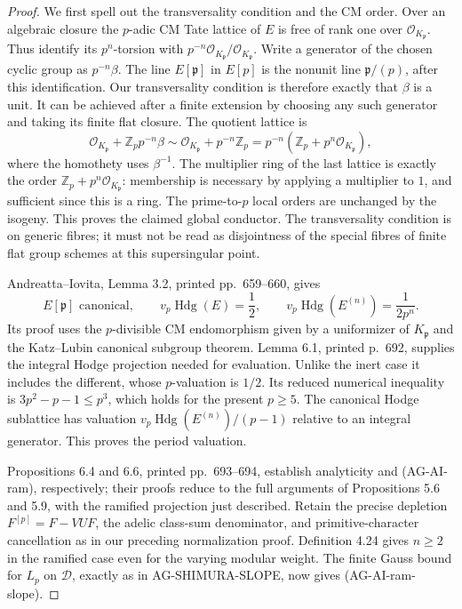 \begin{proof}
We first spell out the transversality condition and the CM order.
Over an algebraic closure the $p$-adic CM Tate lattice of $E$ is
free of rank one over $\mathcal O_{K_{\mathfrak p}}$.
Thus identify its $p^n$-torsion with
$p^{-n}\mathcal O_{K_{\mathfrak p}}/\mathcal O_{K_{\mathfrak p}}$.
Write a generator of the chosen cyclic group as
$p^{-n}\beta$.  The line $E[\mathfrak p]$ in $E[p]$ is
the nonunit line $\mathfrak p/(p)$, after this identification.
Our transversality condition is therefore exactly that $\beta$
is a unit.  It can be achieved after a finite extension by
choosing any such generator and taking its finite flat closure.
The quotient lattice is
\[
 \mathcal O_{K_{\mathfrak p}}+\mathbb Z_p p^{-n}\beta
 \sim \mathcal O_{K_{\mathfrak p}}+p^{-n}\mathbb Z_p
 =p^{-n}(\mathbb Z_p+p^n\mathcal O_{K_{\mathfrak p}}),
\]
where the homothety uses $\beta^{-1}$.  The multiplier ring of
the last lattice is exactly the order
$\mathbb Z_p+p^n\mathcal O_{K_{\mathfrak p}}$: membership is
necessary by applying a multiplier to $1$, and sufficient since
this is a ring.  The prime-to-$p$ local orders are unchanged by
the isogeny.  This proves the claimed global conductor.
The transversality condition is on generic fibres; it must not
be read as disjointness of the special fibres of finite flat
group schemes at this supersingular point.

Andreatta--Iovita, Lemma 3.2, printed pp.~659--660, gives
\[
 E[\mathfrak p]\text{ canonical},\qquad
 v_p\operatorname{Hdg}(E)=\frac12,\qquad
 v_p\operatorname{Hdg}(E^{(n)})=\frac1{2p^n}.
\]
Its proof uses the $p$-divisible CM endomorphism given by a
uniformizer of $K_{\mathfrak p}$ and the Katz--Lubin canonical
subgroup theorem.  Lemma 6.1, printed p.~692, supplies the
integral Hodge projection needed for evaluation.  Unlike the
inert case it includes the different, whose $p$-valuation is
$1/2$.  Its reduced numerical inequality is
$3p^2-p-1\leq p^3$, which holds for the present $p\geq5$.
The canonical Hodge sublattice has valuation
$v_p\operatorname{Hdg}(E^{(n)})/(p-1)$ relative to an integral
generator.  This proves the period valuation.

Propositions 6.4 and 6.6, printed pp.~693--694, establish
analyticity and (AG-AI-ram), respectively; their proofs reduce
to the full arguments of Propositions 5.6 and 5.9, with the
ramified projection just described.  Retain the precise
depletion $F^{[p]}=F-VUF$, the adelic class-sum denominator,
and primitive-character cancellation as in our preceding
normalization proof.  Definition 4.24 gives $n\geq2$ in the
ramified case even for the varying modular weight.
The finite Gauss bound for $L_p$ on $\mathcal D$, exactly as
in AG-SHIMURA-SLOPE, now gives (AG-AI-ram-slope).


\end{proof}
